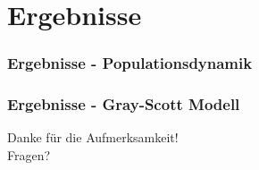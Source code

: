 \documentclass[aspectratio=32]{beamer}
\newcommand{\sectionframe}{\begin{frame}
	\begin{center}
		\textcolor{simtechred}{\Large\insertsection}
	\end{center}
\end{frame}}
\begin{document}
\section{Ergebnisse}
\sectionframe

\begin{frame}
\frametitle{Ergebnisse - Populationsdynamik}

\end{frame}

\begin{frame}
\frametitle{Ergebnisse - Gray-Scott Modell}

\end{frame}

%
%


\begin{frame}
\begin{center}
\Large
\textcolor{simtechred}{Danke für die Aufmerksamkeit! \\ Fragen?}
\end{center}
\end{frame}
\end{document}
